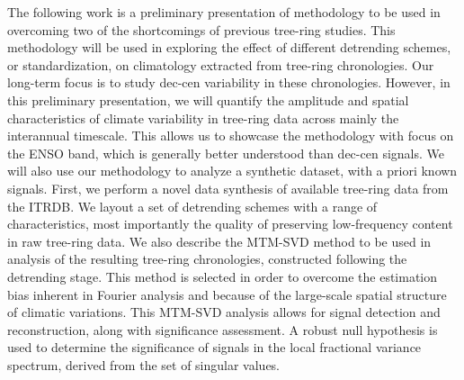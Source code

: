\documentclass[phd,tocprelim]{cornell}
\begin{document}
The following work is a preliminary presentation of methodology 
to be used in overcoming two of the shortcomings of previous 
tree-ring studies. This methodology will be used in exploring 
the effect of different detrending schemes, or standardization, 
on climatology extracted from tree-ring chronologies. Our 
long-term focus is to study dec-cen variability in these 
chronologies. However, in this preliminary presentation, we will 
quantify the amplitude and spatial characteristics of climate 
variability in tree-ring data across mainly the interannual timescale. 
This allows us to showcase the methodology with focus on the ENSO band, 
which is generally better understood than dec-cen signals. We will also use 
our methodology to analyze a synthetic dataset, with a priori known 
signals. First, we perform a novel data synthesis of available tree-ring 
data from the ITRDB. We layout a set of detrending schemes with a range 
of characteristics, most importantly the quality of preserving 
low-frequency content in raw tree-ring data. We also describe the 
MTM-SVD method to be used in analysis of the resulting tree-ring 
chronologies, constructed following the detrending stage. This method 
is selected in order to overcome the estimation bias inherent in Fourier 
analysis and because of the large-scale spatial structure of climatic 
variations. This MTM-SVD analysis allows for signal detection and 
reconstruction, along with significance assessment. A robust null 
hypothesis is used to determine the significance of signals in the 
local fractional variance spectrum, derived from the set of singular 
values.
\par
\end{document}

